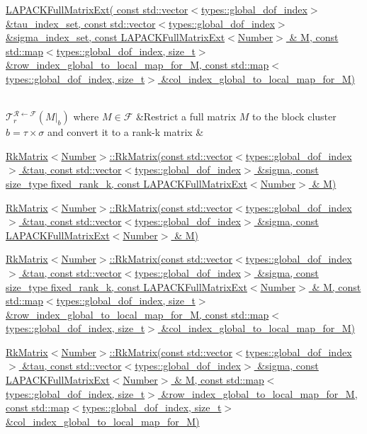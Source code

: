 \begin{longtabu}
\begin{DoxyItemize}
\item \hyperlink{classLAPACKFullMatrixExt}{L\+A\+P\+A\+C\+K\+Full\+Matrix\+Ext( const std\+::vector$<$types\+::global\+\_\+dof\+\_\+index$>$ \&tau\+\_\+index\+\_\+set, const std\+::vector$<$types\+::global\+\_\+dof\+\_\+index$>$ \&sigma\+\_\+index\+\_\+set, const L\+A\+P\+A\+C\+K\+Full\+Matrix\+Ext$<$\+Number$>$ \& M, const std\+::map$<$types\+::global\+\_\+dof\+\_\+index, size\+\_\+t$>$ \&row\+\_\+index\+\_\+global\+\_\+to\+\_\+local\+\_\+map\+\_\+for\+\_\+\+M, const std\+::map$<$types\+::global\+\_\+dof\+\_\+index, size\+\_\+t$>$ \&col\+\_\+index\+\_\+global\+\_\+to\+\_\+local\+\_\+map\+\_\+for\+\_\+\+M)}
\end{DoxyItemize}\\
$\mathcal{T}_r^{\mathcal{R} \leftarrow \mathcal{F}}(M \vert_b)$ where $M \in \mathcal{F}$ &Restrict a full matrix $M$ to the block cluster $b = \tau \times \sigma$ and convert it to a rank-\/k matrix &
\begin{DoxyItemize}
\item \hyperlink{classRkMatrix_acdd046caab506cd04e09b65bb3ffc1f9}{Rk\+Matrix$<$\+Number$>$\+::\+Rk\+Matrix(const std\+::vector$<$types\+::global\+\_\+dof\+\_\+index$>$ \&tau, const std\+::vector$<$types\+::global\+\_\+dof\+\_\+index$>$ \&sigma, const size\+\_\+type fixed\+\_\+rank\+\_\+k, const L\+A\+P\+A\+C\+K\+Full\+Matrix\+Ext$<$\+Number$>$ \& M)} 
\item \hyperlink{classRkMatrix_a4cfccf769e03141b5221c1356bd718a1}{Rk\+Matrix$<$\+Number$>$\+::\+Rk\+Matrix(const std\+::vector$<$types\+::global\+\_\+dof\+\_\+index$>$ \&tau, const std\+::vector$<$types\+::global\+\_\+dof\+\_\+index$>$ \&sigma, const L\+A\+P\+A\+C\+K\+Full\+Matrix\+Ext$<$\+Number$>$ \& M)} 
\item \hyperlink{classRkMatrix_adf204b7ad92834e63c7f63f6b9ca59a9}{Rk\+Matrix$<$\+Number$>$\+::\+Rk\+Matrix(const std\+::vector$<$types\+::global\+\_\+dof\+\_\+index$>$ \&tau, const std\+::vector$<$types\+::global\+\_\+dof\+\_\+index$>$ \&sigma, const size\+\_\+type fixed\+\_\+rank\+\_\+k, const L\+A\+P\+A\+C\+K\+Full\+Matrix\+Ext$<$\+Number$>$ \& M, const std\+::map$<$types\+::global\+\_\+dof\+\_\+index, size\+\_\+t$>$ \&row\+\_\+index\+\_\+global\+\_\+to\+\_\+local\+\_\+map\+\_\+for\+\_\+\+M, const std\+::map$<$types\+::global\+\_\+dof\+\_\+index, size\+\_\+t$>$ \&col\+\_\+index\+\_\+global\+\_\+to\+\_\+local\+\_\+map\+\_\+for\+\_\+\+M)} 
\item \hyperlink{classRkMatrix_aee16f709a7a73d022add2f044cdcb26a}{Rk\+Matrix$<$\+Number$>$\+::\+Rk\+Matrix(const std\+::vector$<$types\+::global\+\_\+dof\+\_\+index$>$ \&tau, const std\+::vector$<$types\+::global\+\_\+dof\+\_\+index$>$ \&sigma, const L\+A\+P\+A\+C\+K\+Full\+Matrix\+Ext$<$\+Number$>$ \& M, const std\+::map$<$types\+::global\+\_\+dof\+\_\+index, size\+\_\+t$>$ \&row\+\_\+index\+\_\+global\+\_\+to\+\_\+local\+\_\+map\+\_\+for\+\_\+\+M, const std\+::map$<$types\+::global\+\_\+dof\+\_\+index, size\+\_\+t$>$ \&col\+\_\+index\+\_\+global\+\_\+to\+\_\+local\+\_\+map\+\_\+for\+\_\+\+M)}

\end{DoxyItemize}
\end{longtabu}
